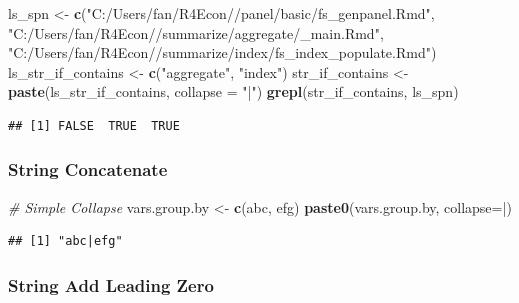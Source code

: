 \documentclass[
]{book}
\newenvironment{Shaded}{\begin{snugshade}}{\end{snugshade}}
\newcommand{\CommentTok}[1]{\textcolor[rgb]{0.56,0.35,0.01}{\textit{#1}}}
\newcommand{\DataTypeTok}[1]{\textcolor[rgb]{0.13,0.29,0.53}{#1}}
\newcommand{\KeywordTok}[1]{\textcolor[rgb]{0.13,0.29,0.53}{\textbf{#1}}}
\newcommand{\NormalTok}[1]{#1}
\newcommand{\StringTok}[1]{\textcolor[rgb]{0.31,0.60,0.02}{#1}}
\begin{document}
\begin{Shaded}
\begin{Highlighting}[]
\NormalTok{ls\_spn \textless{}{-}}\StringTok{ }\KeywordTok{c}\NormalTok{(}\StringTok{"C:/Users/fan/R4Econ//panel/basic/fs\_genpanel.Rmd"}\NormalTok{,}
            \StringTok{"C:/Users/fan/R4Econ//summarize/aggregate/\_main.Rmd"}\NormalTok{,}
            \StringTok{"C:/Users/fan/R4Econ//summarize/index/fs\_index\_populate.Rmd"}\NormalTok{)}
\NormalTok{ls\_str\_if\_contains \textless{}{-}}\StringTok{ }\KeywordTok{c}\NormalTok{(}\StringTok{"aggregate"}\NormalTok{, }\StringTok{"index"}\NormalTok{)}
\NormalTok{str\_if\_contains \textless{}{-}}\StringTok{ }\KeywordTok{paste}\NormalTok{(ls\_str\_if\_contains, }\DataTypeTok{collapse =} \StringTok{"|"}\NormalTok{)}
\KeywordTok{grepl}\NormalTok{(str\_if\_contains, ls\_spn)}
\end{Highlighting}
\end{Shaded}

\begin{verbatim}
## [1] FALSE  TRUE  TRUE
\end{verbatim}

\hypertarget{string-concatenate}{%
\subsubsection{String Concatenate}\label{string-concatenate}}

\begin{Shaded}
\begin{Highlighting}[]
\CommentTok{\# Simple Collapse}
\NormalTok{vars.group.by \textless{}{-}}\StringTok{ }\KeywordTok{c}\NormalTok{(}\StringTok{\textquotesingle{}abc\textquotesingle{}}\NormalTok{, }\StringTok{\textquotesingle{}efg\textquotesingle{}}\NormalTok{)}
\KeywordTok{paste0}\NormalTok{(vars.group.by, }\DataTypeTok{collapse=}\StringTok{\textquotesingle{}|\textquotesingle{}}\NormalTok{)}
\end{Highlighting}
\end{Shaded}

\begin{verbatim}
## [1] "abc|efg"
\end{verbatim}

\hypertarget{string-add-leading-zero}{%
\subsubsection{String Add Leading Zero}\label{string-add-leading-zero}}
\end{document}

